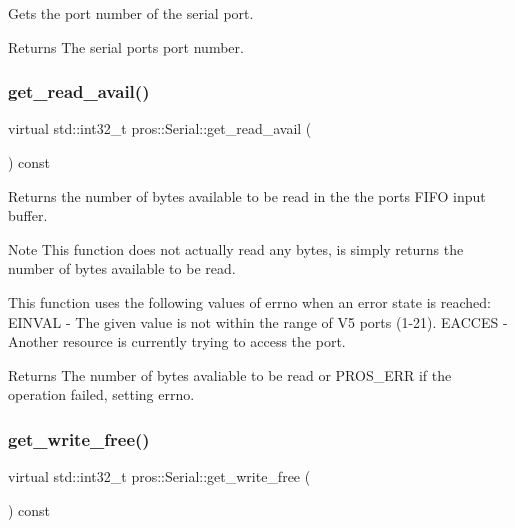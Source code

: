 Gets the port number of the serial port. 

\begin{DoxyReturn}{Returns}
The serial port\textquotesingle{}s port number. 
\end{DoxyReturn}
\mbox{\label{classpros_1_1Serial_aca502997319088ea71cf870fbbca7eb8}} 
\subsubsection{\texorpdfstring{get\+\_\+read\+\_\+avail()}{get\_read\_avail()}}
{\footnotesize\ttfamily virtual std\+::int32\+\_\+t pros\+::\+Serial\+::get\+\_\+read\+\_\+avail (\begin{DoxyParamCaption}{ }\end{DoxyParamCaption}) const\hspace{0.3cm}{\ttfamily [virtual]}}



Returns the number of bytes available to be read in the the port\textquotesingle{}s F\+I\+FO input buffer. 

\begin{DoxyNote}{Note}
This function does not actually read any bytes, is simply returns the number of bytes available to be read.
\end{DoxyNote}
This function uses the following values of errno when an error state is reached\+: E\+I\+N\+V\+AL -\/ The given value is not within the range of V5 ports (1-\/21). E\+A\+C\+C\+ES -\/ Another resource is currently trying to access the port.

\begin{DoxyReturn}{Returns}
The number of bytes avaliable to be read or P\+R\+O\+S\+\_\+\+E\+RR if the operation failed, setting errno. 
\end{DoxyReturn}
\mbox{\label{classpros_1_1Serial_a08daf4a3df3e3c4924d66d0b2eb91538}} 
\subsubsection{\texorpdfstring{get\+\_\+write\+\_\+free()}{get\_write\_free()}}
{\footnotesize\ttfamily virtual std\+::int32\+\_\+t pros\+::\+Serial\+::get\+\_\+write\+\_\+free (\begin{DoxyParamCaption}{ }\end{DoxyParamCaption}) const\hspace{0.3cm}{\ttfamily [virtual]}}



